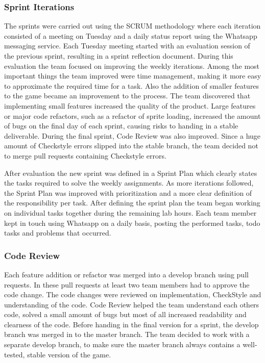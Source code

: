 \subsubsection*{Sprint Iterations}
The sprints were carried out using the SCRUM methodology where each iteration consisted of a meeting on Tuesday and a daily status report using the Whatsapp messaging service. Each Tuesday meeting started with an evaluation session of the previous sprint, resulting in a sprint reflection document. During this evaluation the team focused on improving the weekly iterations. Among the most important things the team improved were time management, making it more easy to approximate the required time for a task. Also the addition of smaller features to the game became an improvement to the process. The team discovered that implementing small features increased the quality of the product. Large features or major code refactors, such as a refactor of sprite loading, increased the amount of bugs on the final day of each sprint, causing risks to handing in a stable deliverable. During the final sprint, Code Review was also improved. Since a huge amount of Checkstyle errors slipped into the stable branch, the team decided not to merge pull requests containing Checkstyle errors.

After evaluation the new sprint was defined in a Sprint Plan which clearly states the tasks required to solve the weekly assignments. As more iterations followed, the Sprint Plan was improved with prioritization and a more clear definition of the responsibility per task. After defining the sprint plan the team began working on individual tasks together during the remaining lab hours. Each team member kept in touch using Whatsapp on a daily basis, posting the performed tasks, todo tasks and problems that occurred. 

\subsubsection*{Code Review}
Each feature addition or refactor was merged into a develop branch using pull requests. In these pull requests at least two team members had to approve the code change. The code changes were reviewed on implementation, CheckStyle and understanding of the code. Code Review helped the team understand each others code, solved a small amount of bugs but most of all increased readability and clearness of the code. Before handing in the final version for a sprint, the develop branch was merged in to the master branch. The team decided to work with a separate develop branch, to make sure the master branch always contains a well-tested, stable version of the game.

